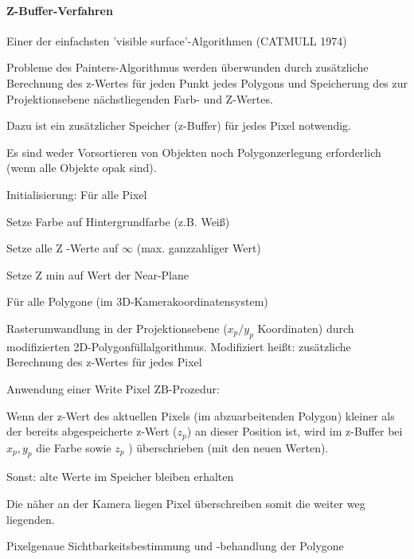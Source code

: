 \documentclass[landscape]{article}
\begin{document}
\begin{multicols}{3}
  \paragraph{Z-Buffer-Verfahren}
  \begin{itemize*}
    \item Einer der einfachsten 'visible surface'-Algorithmen (CATMULL 1974)
    \item Probleme des Painters-Algorithmus werden überwunden durch zusätzliche Berechnung des z-Wertes für jeden Punkt jedes Polygons und Speicherung des zur Projektionsebene nächstliegenden Farb- und Z-Wertes.
    \item Dazu ist ein zusätzlicher Speicher (z-Buffer) für jedes Pixel notwendig.
    \item Es sind weder Vorsortieren von Objekten noch Polygonzerlegung erforderlich (wenn alle Objekte opak sind).
  \end{itemize*}
  
  Initialisierung: Für alle Pixel
  \begin{itemize*}
    \item Setze Farbe auf Hintergrundfarbe (z.B. Weiß)
    \item Setze alle Z -Werte auf $\infty$ (max. ganzzahliger Wert)
    \item Setze Z min auf Wert der Near-Plane
  \end{itemize*}
  
  Für alle Polygone (im 3D-Kamerakoordinatensystem)
  \begin{itemize*}
    \item Rasterumwandlung in der Projektionsebene ($x_p/y_p$ Koordinaten) durch modifizierten 2D-Polygonfüllalgorithmus. Modifiziert heißt: zusätzliche Berechnung des z-Wertes für jedes Pixel
    \item Anwendung einer Write Pixel ZB-Prozedur:
    \item Wenn der z-Wert des aktuellen Pixels (im abzuarbeitenden Polygon) kleiner als der bereits abgespeicherte z-Wert ($z_p$) an dieser Position ist, wird im z-Buffer bei $x_p , y_p$ die Farbe sowie $z_p$ ) überschrieben (mit den neuen Werten).
    \item Sonst: alte Werte im Speicher bleiben erhalten
    \item Die näher an der Kamera liegen Pixel überschreiben somit die weiter weg liegenden.
    \item Pixelgenaue Sichtbarkeitsbestimmung und -behandlung der Polygone
  \end{itemize*}
  

\end{multicols}
\end{document}
